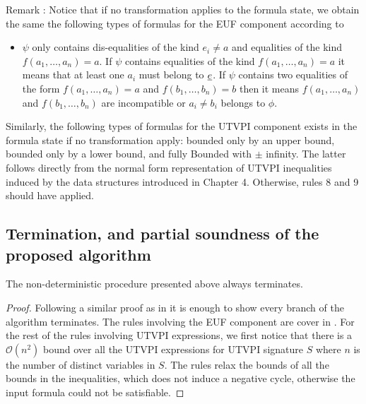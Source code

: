 Remark \label{my_remark}: Notice that if no transformation applies to the formula state, we obtain the same 
the following types of formulas for the EUF component according to \cite{ghilardi2020compactly} 

\begin{itemize}
  \item $\psi$ only contains dis-equalities of the kind $e_i \neq a$ and equalities of
    the kind $f(a_1, \dots, a_n) = a$. If $\psi$ contains equalities of the
    kind $f(a_1, \dots, a_n) = a$ it means that at least one $a_i$ must belong
    to $\underline{e}$. If $\psi$ contains two equalities of the form
    $f(a_1, \dots, a_n) = a$ and $f(b_1, \dots, b_n) = b$ then it means
    $f(a_1, \dots, a_n)$ and $f(b_1, \dots, b_n)$ are incompatible or $a_i \neq b_i$
    belongs to $\phi$.
\end{itemize}

Similarly, the following types of formulas for the UTVPI component exists in the
formula state if no transformation apply: bounded only by an upper bound, 
bounded only by a lower bound, and fully Bounded with $\pm$ infinity. The
latter follows directly from the normal form representation of UTVPI inequalities
induced by the data structures introduced in Chapter 4. Otherwise, rules
8 and 9 should have applied.

\subsection{Termination, and partial soundness of the
proposed algorithm}

\begin{lemma}
  The non-deterministic procedure presented above 
  always terminates.
\end{lemma}

\begin{proof}
  Following a similar proof as in \cite{ghilardi2020compactly}
  it is enough to show every branch of the algorithm terminates.
  The rules involving the EUF component are cover in
  \cite{ghilardi2020compactly}. For the rest of the rules
  involving UTVPI expressions, we first notice that there is a 
  $\mathcal{O}(n^2)$ bound over all the UTVPI expressions
  for UTVPI signature $S$ where $n$ is the number of distinct
  variables in $S$. The rules relax the bounds of all the
  bounds in the inequalities, which does not induce a negative
  cycle, otherwise the input formula could not be satisfiable.
\end{proof} 

